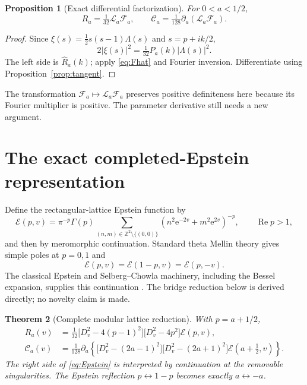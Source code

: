 \documentclass[11pt,letterpaper]{article}
\numberwithin{equation}{section}
\newtheorem{proposition}{Proposition}[section]
\newtheorem{theorem}[proposition]{Theorem}
\theoremstyle{remark}\newtheorem{remark}[proposition]{Remark}
\newcommand{\calC}{\mathcal C}
\newcommand{\calF}{\mathcal F}
\newcommand{\calE}{\mathcal E}
\newcommand{\Repart}{\operatorname{Re}}
\newcommand{\ee}{\mathrm e}
\begin{document}
\begin{proposition}[Exact differential factorization]\label{prop:primitive}
For $0<a<1/2$,
\begin{equation}\label{eq:diffFactor}
 \boxed{R_a=\tfrac1{32}\mathcal L_a\calF_a,\qquad
        \calC_a=\tfrac1{128}\partial_a(\mathcal L_a\calF_a).}
\end{equation}
\end{proposition}
\begin{proof}
Since $\xi(s)=\tfrac12s(s-1)\Lambda(s)$ and $s=p+ik/2$,
\[
 2|\xi(s)|^2=\tfrac1{32}P_a(k)|\Lambda(s)|^2.
\]
The left side is $\widehat R_a(k)$; apply \eqref{eq:Fhat} and Fourier inversion. Differentiate using Proposition~\ref{prop:tangent}.
\end{proof}
The transformation $\calF_a\mapsto\mathcal L_a\calF_a$ preserves positive definiteness here because its Fourier multiplier is positive. The parameter derivative still needs a new argument.

\section{The exact completed-Epstein representation}
Define the rectangular-lattice Epstein function by
\begin{equation}
 \calE(p,v)=\pi^{-p}\Gamma(p)
 \sum_{(n,m)\in\mathbb Z^2\setminus\{(0,0)\}}
 (n^2\ee^{-2v}+m^2\ee^{2v})^{-p},
 \qquad \Repart p>1,
\end{equation}
and then by meromorphic continuation. Standard theta Mellin theory gives simple poles at $p=0,1$ and
\begin{equation}
 \calE(p,v)=\calE(1-p,v)=\calE(p,-v).
\end{equation}
The classical Epstein and Selberg--Chowla machinery, including the Bessel expansion, supplies this continuation \cite{ribeiro}. The bridge reduction below is derived directly; no novelty claim is made.

\begin{theorem}[Complete modular lattice reduction]\label{thm:Epstein}
With $p=a+1/2$,
\begin{align}
 R_a(v)&=\frac1{32}
 \bigl[D_v^2-4(p-1)^2\bigr]\bigl[D_v^2-4p^2\bigr]\calE(p,v),
 \label{eq:Epstein}\\
 \calC_a(v)&=\frac1{128}\partial_a
 \left\{\bigl[D_v^2-(2a-1)^2\bigr]
             \bigl[D_v^2-(2a+1)^2\bigr]\calE(a+\tfrac12,v)\right\}.
 \label{eq:EpsteinC}
\end{align}
The right side of \eqref{eq:Epstein} is interpreted by continuation at the removable singularities. The Epstein reflection $p\leftrightarrow1-p$ becomes exactly $a\leftrightarrow-a$.
\end{theorem}
\end{document}
